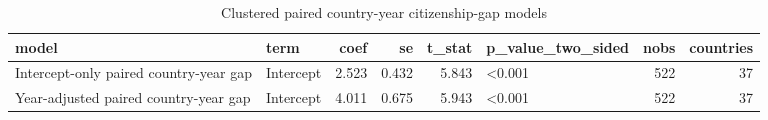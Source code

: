 \begin{table}
\caption{Clustered paired country-year citizenship-gap models}
\label{tab:citizenship_gap_clustered}
\begin{tabular}{llrrrlrr}
\toprule
model & term & coef & se & t\_stat & p\_value\_two\_sided & nobs & countries \\
\midrule
Intercept-only paired country-year gap & Intercept & 2.523 & 0.432 & 5.843 & <0.001 & 522 & 37 \\
Year-adjusted paired country-year gap & Intercept & 4.011 & 0.675 & 5.943 & <0.001 & 522 & 37 \\
\bottomrule
\end{tabular}
\end{table}

